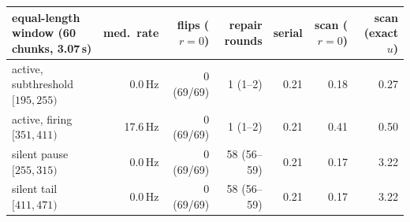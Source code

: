 \begin{tabular}{lrrrrrr}
\toprule
equal-length window (60 chunks, 3.07\,s) & med.\ rate & flips ($r=0$) & repair rounds & serial & scan ($r=0$) & scan (exact $u$)\\
\midrule
active, subthreshold $[195,255)$ & 0.0\,Hz & 0 (69/69) & 1 (1--2) & 0.21 & 0.18 & 0.27\\
active, firing $[351,411)$ & 17.6\,Hz & 0 (69/69) & 1 (1--2) & 0.21 & 0.41 & 0.50\\
silent pause $[255,315)$ & 0.0\,Hz & 0 (69/69) & 58 (56--59) & 0.21 & 0.17 & 3.22\\
silent tail $[411,471)$ & 0.0\,Hz & 0 (69/69) & 58 (56--59) & 0.21 & 0.17 & 3.22\\
\bottomrule
\end{tabular}
